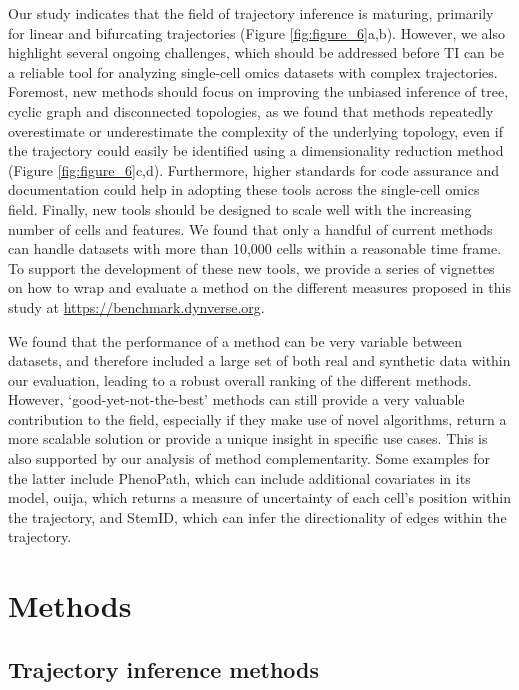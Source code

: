 Our study indicates that the field of trajectory inference is maturing, primarily for linear and bifurcating trajectories (Figure \ref{fig:figure_6}a,b). However, we also highlight several ongoing challenges, which should be addressed before TI can be a reliable tool for analyzing single-cell omics datasets with complex trajectories. Foremost, new methods should focus on improving the unbiased inference of tree, cyclic graph and disconnected topologies, as we found that methods repeatedly overestimate or underestimate the complexity of the underlying topology, even if the trajectory could easily be identified using a dimensionality reduction method (Figure \ref{fig:figure_6}c,d). Furthermore, higher standards for code assurance and documentation could help in adopting these tools across the single-cell omics field. Finally, new tools should be designed to scale well with the increasing number of cells and features. We found that only a handful of current methods can handle datasets with more than 10,000 cells within a reasonable time frame. To support the development of these new tools, we provide a series of vignettes on how to wrap and evaluate a method on the different measures proposed in this study at \href{https://benchmark.dynverse.org}{https://benchmark.dynverse.org}.

We found that the performance of a method can be very variable between datasets, and therefore included a large set of both real and synthetic data within our evaluation, leading to a robust overall ranking of the different methods. However, ‘good-yet-not-the-best’ methods \cite{norel_selfassessmenttrapcan_2011} can still provide a very valuable contribution to the field, especially if they make use of novel algorithms, return a more scalable solution or provide a unique insight in specific use cases. This is also supported by our analysis of method complementarity. Some examples for the latter include PhenoPath, which can include additional covariates in its model, ouija, which returns a measure of uncertainty of each cell’s position within the trajectory, and StemID, which can infer the directionality of edges within the trajectory.


\section{Methods}

\subsection{Trajectory inference methods}

